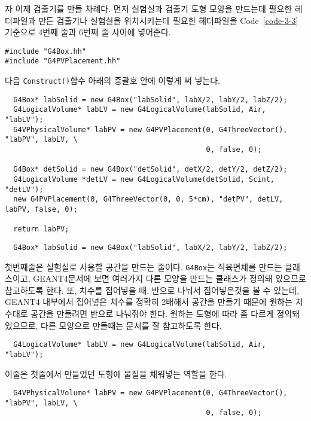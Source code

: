 자 이제 검출기를 만들 차례다. 먼저 실험실과 검출기 도형 모양을 만드는데 필요한
헤더파일과 만든 검출기나 실험실을 위치시키는데 필요한 헤더파일을
Code~\ref{code-3-3} 기준으로 4번째 줄과 6번째 줄 사이에 넣어준다.
\begin{pc}
\begin{lstlisting}
#include "G4Box.hh"
#include "G4PVPlacement.hh"
\end{lstlisting}
\end{pc}
다음 \texttt{Construct()}함수 아래의 중괄호 안에 이렇게 써 넣는다.
\begin{pc}
\begin{lstlisting}
  G4Box* labSolid = new G4Box("labSolid", labX/2, labY/2, labZ/2);
  G4LogicalVolume* labLV = new G4LogicalVolume(labSolid, Air, "labLV");
  G4VPhysicalVolume* labPV = new G4PVPlacement(0, G4ThreeVector(), "labPV", labLV, \
                                               0, false, 0);

  G4Box* detSolid = new G4Box("detSolid", detX/2, detY/2, detZ/2);
  G4LogicalVolume *detLV = new G4LogicalVolume(detSolid, Scint, "detLV");
  new G4PVPlacement(0, G4ThreeVector(0, 0, 5*cm), "detPV", detLV, labPV, false, 0);

  return labPV;
\end{lstlisting}
\end{pc}
\begin{pc}
\begin{lstlisting}
  G4Box* labSolid = new G4Box("labSolid", labX/2, labY/2, labZ/2);
\end{lstlisting}
\end{pc}
첫번째줄은 실험실로 사용할 공간을 만드는 줄이다. \texttt{G4Box}는 직육면체를
만드는 클래스이고, GEANT4문서에 보면 여러가지 다른 모양을 만드는 클래스가
정의돼 있으므로 참고하도록 한다. 또, 치수를 집어넣을 때, 반으로 나눠서
집어넣은것을 볼 수 있는데, GEANT4 내부에서 집어넣은 치수를 정확히 2배해서
공간을 만들기 때문에 원하는 치수대로 공간을 만들려면 반으로 나눠줘야 한다.
원하는 도형에 따라 좀 다르게 정의돼 있으므로, 다른 모양으로 만들때는 문서를 잘
참고하도록 한다.
\begin{pc}
\begin{lstlisting}
  G4LogicalVolume* labLV = new G4LogicalVolume(labSolid, Air, "labLV");
\end{lstlisting}
\end{pc}
이줄은 첫줄에서 만들었던 도형에 물질을 채워넣는 역할을 한다.
\begin{pc}
\begin{lstlisting}
  G4VPhysicalVolume* labPV = new G4PVPlacement(0, G4ThreeVector(), "labPV", labLV, \
                                               0, false, 0);
\end{lstlisting}
\end{pc}
